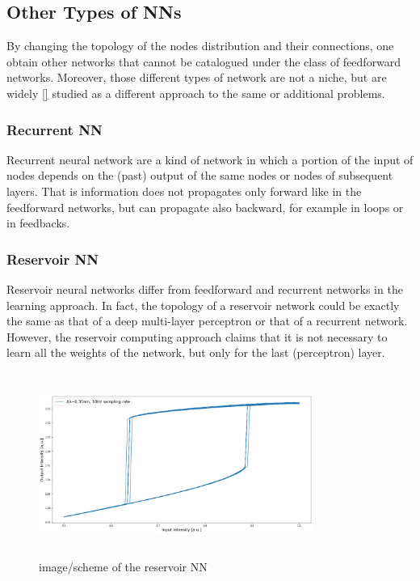 \subsection{Other Types of NNs}
\label{ssec:Other_Types_of_NNs}
By changing the topology of the nodes distribution and their connections, one obtain other networks that cannot be catalogued under the class of feedforward networks.
Moreover, those different types of network are not a niche, but are widely \ref{} studied as a different approach to the same or additional problems.

\subsubsection{Recurrent NN}
\label{sssec:Recurrent_NN}
Recurrent neural network are a kind of network in which a portion of the input of nodes depends on the (past) output of the same nodes or nodes of subsequent layers.
That is information does not propagates only forward like in the feedforward networks, but can propagate also backward, for example in loops or in feedbacks.

\subsubsection{Reservoir NN}
\label{sssec:Reservoir_NN}
Reservoir neural networks differ from feedforward and recurrent networks in the learning approach.
In fact, the topology of a reservoir network could be exactly the same as that of a deep multi-layer perceptron or that of a recurrent network.
However, the reservoir computing approach claims that it is not necessary to learn all the weights of the network, but only for the last (perceptron) layer.

\begin{figure}[ht]
	\centering
	\includegraphics[draft,width=9cm,height=6cm]{figures/foo.png}
	\caption{image/scheme of the reservoir NN}
	\label{fig:reservoirNN}
\end{figure}

